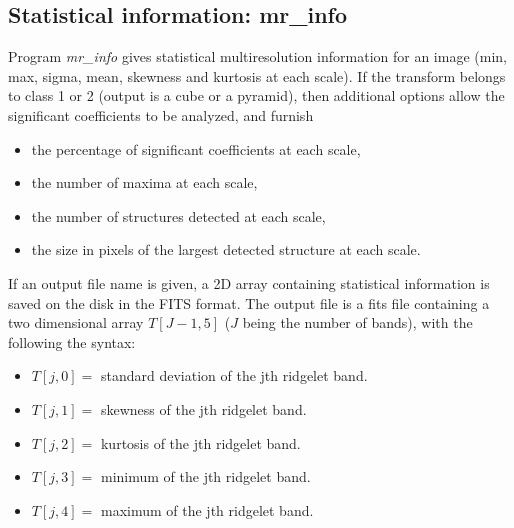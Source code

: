 \subsection{Statistical information: mr\_info}
Program 
{\em mr\_info} gives statistical multiresolution information for an image
(min, max, sigma, mean, skewness and kurtosis at each scale). 
If the transform belongs to 
class 1 or 2
(output is a cube or a pyramid), then additional options allow the 
significant coefficients to be analyzed, and furnish 
\begin{itemize}
\item the percentage of significant coefficients at each scale,
\item the number of maxima at each scale,
\item the number of structures detected at each scale,
\item the size in pixels of the largest  detected structure at each scale.
\end{itemize}
If an output file name is given, a 2D array containing statistical information
is saved on the disk in the FITS format. The output file is a 
fits file containing a two dimensional array $T[J-1,5]$ ($J$ being the
number of bands), with the following the syntax:
\begin{itemize}
\baselineskip=0.4truecm
\item $T[j,0] = $ standard deviation of the jth ridgelet band.
\item $T[j,1] = $ skewness of the jth ridgelet band.
\item $T[j,2] = $ kurtosis of the jth ridgelet band.
\item $T[j,3] = $ minimum of the jth ridgelet band.
\item $T[j,4] = $ maximum of the jth ridgelet band.
\end{itemize}

